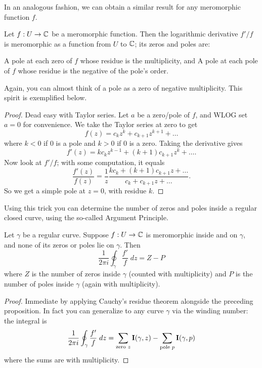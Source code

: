 In an analogous fashion, we can obtain a similar result for any meromorphic function $f$.
\begin{proposition}
	Let $f : U \to \mathbb C$ be a meromorphic function.
	Then the logarithmic derivative $f'/f$ is meromorphic as a function from $U$ to $\mathbb C$;
	its zeros and poles are:
	\begin{enumerate}[(i)]
		\ii A pole at each zero of $f$ whose residue is the multiplicity, and
		\ii A pole at each pole of $f$ whose residue is the negative of the pole's order.
	\end{enumerate}
\end{proposition}
Again, you can almost think of a pole as a zero of negative multiplicity.
This spirit is exemplified below.
\begin{proof}
	Dead easy with Taylor series.
	Let $a$ be a zero/pole of $f$, and WLOG set $a=0$ for convenience.
	We take the Taylor series at zero to get
	\[ f(z) = c_k z^k + c_{k+1} z^{k+1} + \dots \] %
	where $k < 0$ if $0$ is a pole and $k > 0$ if $0$ is a zero.
	Taking the derivative gives
	\[ f'(z) = kc_k z^{k-1} + (k+1)c_{k+1}z^{k} + \dots. \]
	Now look at $f'/f$; with some computation, it equals
	\[
		\frac{f'(z)}{f(z)}
		= \frac 1z \frac{kc_k + (k+1)c_{k+1}z + \dots}{c_k + c_{k+1}z + \dots}.
	\]
	So we get a simple pole at $z=0$, with residue $k$.
\end{proof}

Using this trick you can determine the number of zeros and poles inside a regular closed curve,
using the so-called Argument Principle.

\begin{theorem}
	\label{thm:arg_principle}
	Let $\gamma$ be a regular curve.
	Suppose $f : U \to \mathbb C$ is meromorphic inside and on $\gamma$, and
	none of its zeros or poles lie on $\gamma$.
	Then
	\[
		\frac{1}{2\pi i} \oint_\gamma \frac{f'}{f} \; dz
		= Z - P
	\]
	where $Z$ is the number of zeros inside $\gamma$ (counted with multiplicity)
	and $P$ is the number of poles inside $\gamma$ (again with multiplicity).
\end{theorem}
\begin{proof}
	Immediate by applying Cauchy's residue theorem alongside the preceding proposition.
	In fact you can generalize to any curve $\gamma$ via the winding number:
	the integral is
	\[ \frac{1}{2\pi i} \oint_\gamma \frac{f'}{f} \; dz
		= \sum_{\text{zero $z$}} \operatorname{\mathbf I}(\gamma,z)
		- \sum_{\text{pole $p$}} \operatorname{\mathbf I}(\gamma,p) \]
	where the sums are with multiplicity.
\end{proof}

